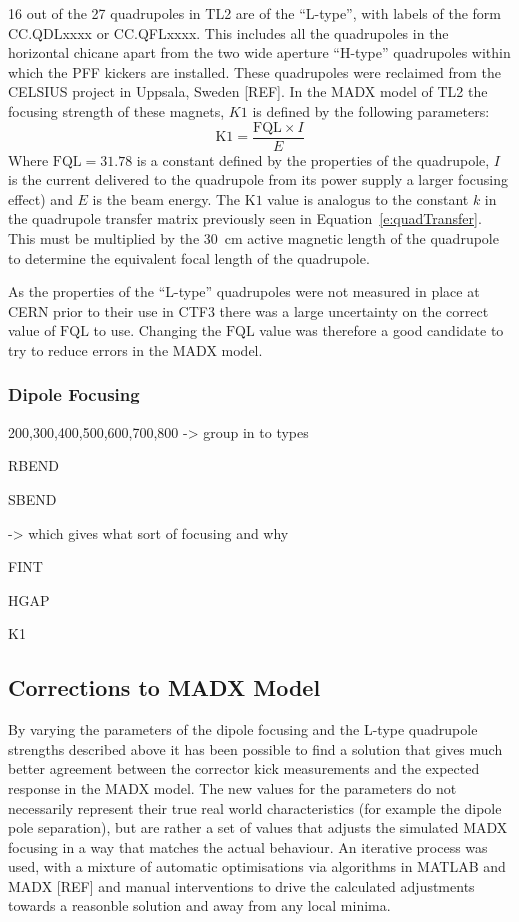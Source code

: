 16 out of the 27 quadrupoles in TL2 are of the ``L-type'', with labels of the form CC.QDLxxxx or CC.QFLxxxx. This includes all the quadrupoles in the horizontal chicane apart from the two wide aperture ``H-type'' quadrupoles within which the PFF kickers are installed. These quadrupoles were reclaimed from the CELSIUS project in Uppsala, Sweden [REF]. In the MADX model of TL2 the focusing strength of these magnets, \(K1\) is defined by the following parameters:
\begin{equation}
\mathrm{K1} = \frac{\mathrm{FQL}\times I}{E}
\end{equation}
Where \(\mathrm{FQL} = 31.78\) is a constant defined by the properties of the quadrupole, \(I\) is the current delivered to the quadrupole from its power supply a larger focusing effect) and \(E\) is the beam energy. The \(\mathrm{K1}\) value is analogus to the constant \(k\) in the quadrupole transfer matrix previously seen in Equation~\ref{e:quadTransfer}. This must be multiplied by the 30~cm active magnetic length of the quadrupole to determine the equivalent focal length of the quadrupole.

As the properties of the ``L-type'' quadrupoles were not measured in place at CERN prior to their use in CTF3 there was a large uncertainty on the correct value of \(\mathrm{FQL}\) to use. Changing the \(\mathrm{FQL}\) value was therefore a good candidate to try to reduce errors in the MADX model.

\subsubsection{Dipole Focusing}
\label{sss:edgeFocusing}

200,300,400,500,600,700,800 -> group in to types

RBEND

SBEND

-> which gives what sort of focusing and why

FINT

HGAP

K1

\subsection{Corrections to MADX Model}
\label{ss:modelCorrections}

By varying the parameters of the dipole focusing and the L-type quadrupole strengths described above it has been possible to find a solution that gives much better agreement between the corrector kick measurements and the expected response in the MADX model. The new values for the parameters do not necessarily represent their true real world characteristics (for example the dipole pole separation), but are rather a set of values that adjusts the simulated MADX focusing in a way that matches the actual behaviour. An iterative process was used, with a mixture of automatic optimisations via algorithms in MATLAB and MADX [REF] and manual interventions to drive the calculated adjustments towards a reasonble solution and away from any local minima.

